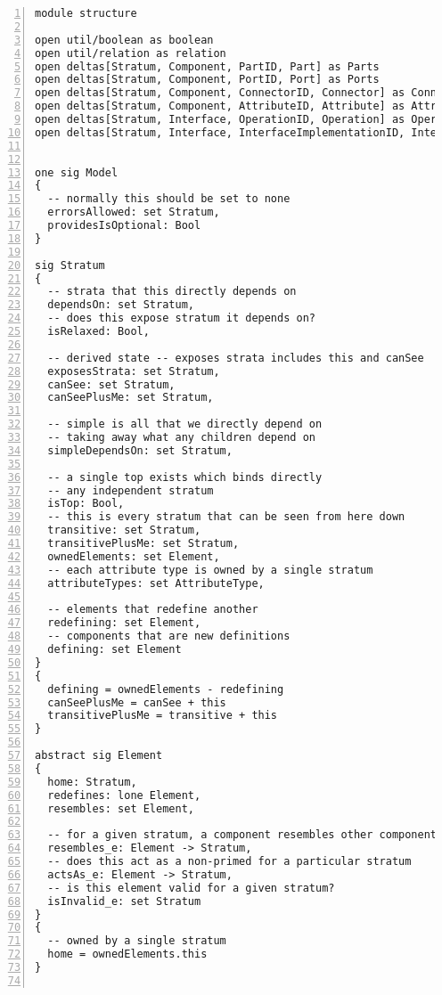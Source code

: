 \lstset{frame=tb, aboveskip=12pt, belowskip=-3pt, breaklines=true, basicstyle=\tiny\ttfamily, tabsize=2, mathescape=true}
\begin{lstlisting}[caption={structure.als}, numbers=left]
module structure

open util/boolean as boolean
open util/relation as relation
open deltas[Stratum, Component, PartID, Part] as Parts
open deltas[Stratum, Component, PortID, Port] as Ports
open deltas[Stratum, Component, ConnectorID, Connector] as Connectors
open deltas[Stratum, Component, AttributeID, Attribute] as Attributes
open deltas[Stratum, Interface, OperationID, Operation] as Operations
open deltas[Stratum, Interface, InterfaceImplementationID, InterfaceImplementation] as InterfaceImplementation


one sig Model
{
  -- normally this should be set to none
  errorsAllowed: set Stratum,
  providesIsOptional: Bool
}

sig Stratum
{
  -- strata that this directly depends on
  dependsOn: set Stratum,
  -- does this expose stratum it depends on?
  isRelaxed: Bool,

  -- derived state -- exposes strata includes this and canSee
  exposesStrata: set Stratum,
  canSee: set Stratum,
  canSeePlusMe: set Stratum,

  -- simple is all that we directly depend on
  -- taking away what any children depend on
  simpleDependsOn: set Stratum,

  -- a single top exists which binds directly
  -- any independent stratum
  isTop: Bool,
  -- this is every stratum that can be seen from here down
  transitive: set Stratum,
  transitivePlusMe: set Stratum,
  ownedElements: set Element,
  -- each attribute type is owned by a single stratum
  attributeTypes: set AttributeType,

  -- elements that redefine another
  redefining: set Element,
  -- components that are new definitions
  defining: set Element
}
{
  defining = ownedElements - redefining
  canSeePlusMe = canSee + this
  transitivePlusMe = transitive + this
}

abstract sig Element
{
  home: Stratum,
  redefines: lone Element,
  resembles: set Element,

  -- for a given stratum, a component resembles other components in a given stratum view
  resembles_e: Element -> Stratum,
  -- does this act as a non-primed for a particular stratum
  actsAs_e: Element -> Stratum,
  -- is this element valid for a given stratum?
  isInvalid_e: set Stratum
}
{
  -- owned by a single stratum
  home = ownedElements.this
}


\end{lstlisting}
